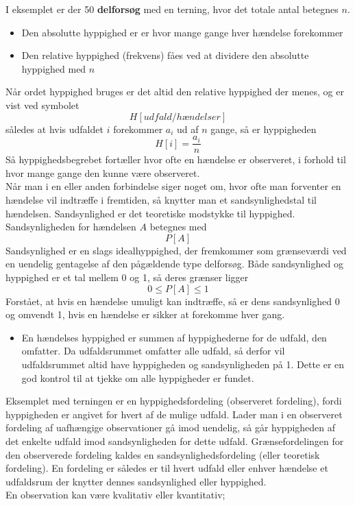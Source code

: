 \documentclass[11pt]{article}
\begin{document}
I eksemplet er der 50 \textbf{delforsøg} med en terning, hvor det totale antal betegnes $n$. 
\begin{itemize}\itemsep-2pt
\item Den absolutte hyppighed er er hvor mange gange hver hændelse forekommer
\item Den relative hyppighed (frekvens) fåes ved at dividere den absolutte hyppighed med $n$
\end{itemize}
Når ordet hyppighed bruges er det altid den relative hyppighed der menes, og er vist ved symbolet
$$H[udfald/hændelser]$$
således at hvis udfaldet $i$ forekommer $a_i$ ud af $n$ gange, så er hyppigheden
$$H[i]=\frac{a_i}{n}$$
Så hyppighedsbegrebet fortæller hvor ofte en hændelse er observeret, i forhold til hvor mange gange den kunne være observeret. \\[0.2cm]
Når man i en eller anden forbindelse siger noget om, hvor ofte man forventer en hændelse vil indtræffe i fremtiden, så knytter man et sandsynlighedstal til hændelsen. Sandsynlighed er det teoretiske modstykke til hyppighed. Sandsynligheden for hændelsen $A$ betegnes med 
$$P[A]$$
Sandsynlighed er en slags idealhyppighed, der fremkommer som grænseværdi ved en uendelig gentagelse af den pågældende type delforsøg. Både sandsynlighed og hyppighed er et tal mellem 0 og 1, så deres grænser ligger
$$0\leq P[A] \leq 1$$
Forstået, at hvis en hændelse umuligt kan indtræffe, så er dens sandsynlighed 0 og omvendt 1, hvis en hændelse er sikker at forekomme hver gang.
\begin{itemize}\itemsep-2pt
\item En hændelses hyppighed er summen af hyppighederne for de udfald, den omfatter. Da udfaldsrummet omfatter alle udfald, så derfor vil udfaldsrummet altid have hyppigheden og sandsynligheden på 1. Dette er en god kontrol til at tjekke om alle hyppigheder er fundet. 
\end{itemize}
Eksemplet med terningen er en hyppighedsfordeling (observeret fordeling), fordi hyppigheden er angivet for hvert af de mulige udfald. Lader man i en observeret fordeling af uafhængige observationer gå imod uendelig, så går hyppigheden af det enkelte udfald imod sandsynligheden for dette udfald. Grænsefordelingen for den observerede fordeling kaldes en sandsynlighedsfordeling (eller teoretisk fordeling). En fordeling er således er til hvert udfald eller enhver hændelse et udfaldsrum der knytter dennes sandsynlighed eller hyppighed. \\[0.2cm]
En observation kan være kvalitativ eller kvantitativ;
\end{document}
